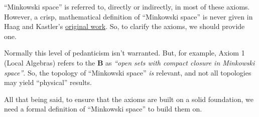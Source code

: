 ``Minkowski space'' is referred to, directly or indirectly, in most of these axioms. However, a crisp, mathematical definition of ``Minkowski space'' is never given in Haag and Kastler's \href{https://doi.org/10.1063/1.1704187}{original work}. So, to clarify the axioms, we should provide one.

Normally this level of pedanticism isn't warranted. But, for example, Axiom 1 (Local Algebras) refers to the $\mathbf{B}$ as \textit{``open sets with compact closure in Minkowski space''}. So, the topology of ``Minkowski space'' \textit{is} relevant, and not all topologies may yield ``physical'' results.

All that being said, to ensure that the axioms are built on a solid foundation, we need a formal definition of ``Minkowski space'' to build them on.
